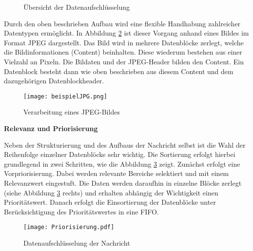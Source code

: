 \begin{figure}[H]
  \centering
  \hfill
  \caption{Übersicht der Datenaufschlüsselung}
  \label{fig:uebersichtdatenaufschluesselung}
\end{figure}

Durch den oben beschrieben Aufbau wird eine flexible Handhabung
zahlreicher Datentypen ermöglicht. In Abbildung \ref{fig:beispielJPG} ist
dieser Vorgang anhand eines Bildes im Format JPEG dargestellt. Das Bild wird in mehrere
Datenblöcke zerlegt, welche die Bildinformationen (Content) beinhalten.
Diese wiederum bestehen aus einer Vielzahl an Pixeln.
Die Bildaten und der JPEG-Header bilden den Content. Ein Datenblock besteht dann
wie oben beschrieben aus diesem Content und dem dazugehörigen Datenblockheader.

\begin{figure}[H]
	\centering
	\texttt{[image: beispielJPG.png]}
	\caption{Verarbeitung eines JPEG-Bildes}
	\label{fig:beispielJPG}
\end{figure}

\textbf{Relevanz und Priorisierung}

Neben der Strukturierung und des Aufbaus der Nachricht selbst ist die
Wahl der Reihenfolge einzelner Datenblöcke sehr wichtig. Die Sortierung erfolgt
hierbei grundlegend in zwei Schritten, wie die Abbildung \ref{fig:priorisierungen}
zeigt.
Zunächst erfolgt eine Vorpriorisierung. Dabei werden relevante Bereiche
selektiert und mit einem Relevanzwert eingestuft. Die
Daten werden daraufhin in einzelne Blöcke zerlegt (siehe Abbildung
\ref{fig:priorisierungen} rechts) und erhalten abhängig der Wichtigkeit einen
Prioritätswert. Danach erfolgt die Einsortierung der Datenblöcke unter
Berücksichtigung des Prioritätswertes in eine \gls{FIFO}.

\begin{figure}[H]
	\centering
	\texttt{[image: Priorisierung.pdf]}
	\caption{Datenaufschlüsselung der Nachricht}
	\label{fig:priorisierungen}
\end{figure}


